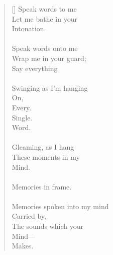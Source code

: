 \documentclass{article}
\begin{document}
\settowidth{\versewidth}{Than Tycho Brahe, or Erra Pater:}
\begin{verse}[\versewidth]
Speak words to me \\
Let me bathe in your \\
Intonation. \\
\\
Speak words onto me \\
Wrap me in your guard; \\
Say everything \\
\\
Swinging as I'm hanging \\
On, \\
Every. \\
\tab Single. \\
\tab \tab Word. \\
\\
Gleaming, as I hang \\
These moments in my \\
Mind. \\
\\
Memories in frame. \\
\\
Memories spoken into my mind \\
Carried by, \\
The sounds which your \\
Mind–– \\
Makes. \\
\end{verse}
\end{document}
